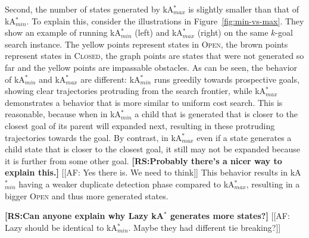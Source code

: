\documentclass{aicom2e}
\newcommand{\kgs}{$k$-goal search}
\newcommand{\kastar}{kA$^*$}
\newcommand{\kastarmin}{kA$^*_{min}$}
\newcommand{\kastarmax}{kA$^*_{max}$}
\newcommand{\open}{\textsc{Open}}
\newcommand{\closed}{\textsc{Closed}}
\newcommand{\roni}[1]{\textbf{[RS:#1]}}
\begin{document}
Second, the number of states generated by \kastarmax{} is slightly smaller than that of \kastarmin{}. To explain this, consider the illustrations in Figure~\ref{fig:min-vs-max}. They show an example of running \kastarmin{} (left) and \kastarmax{} (right) on the same \kgs{} instance. The yellow points represent states in \open{}, the brown points represent states in \closed{}, the graph points are states that were not generated so far and the yellow points are impassable obstacles. As can be seen, the behavior of \kastarmin{} and \kastarmax{} are different: \kastarmin{} runs greedily towards prospective goals, showing clear trajectories protruding from the search frontier, while \kastarmax{} demonstrates a behavior that is more similar to uniform cost search. This is reasonable, because when in \kastarmin{} a child that is generated that is closer to the closest goal of its parent will expanded next, resulting in these protruding trajectories towards the goal. By contrast, in \kastarmax{} even if a state generates a child state that is closer to the closest goal, it still may not be expanded because it is further from some other goal. \roni{Probably there's a nicer way to explain this.} 
[[AF: Yes there	is. We need to think]]
This behavior results in \kastarmin{} having a weaker duplicate detection phase compared to \kastarmax{}, resulting in a bigger \open{} and thus more generated states. 

\roni{Can anyone explain why Lazy \kastar{} generates more states?}
[[AF: Lazy should be identical to \kastarmin{}. Maybe they had different tie breaking?]]
\end{document}
